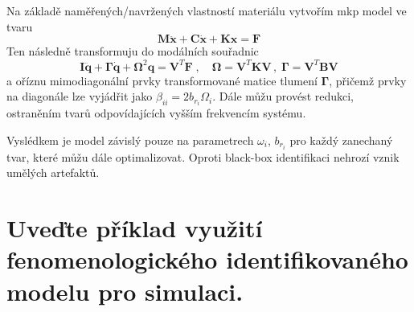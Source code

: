 \documentclass{article}
\begin{document}
	Na základě naměřených/navržených vlastností materiálu vytvořím mkp model ve tvaru
	\begin{equation*}
		\bm{M}\bm{\ddot{x}} + \bm{C}\bm{\dot{x}} + \bm{K}\bm{x} = \bm{F}
	\end{equation*}
	Ten následně transformuju do modálních souřadnic
	\begin{equation*}
		\bm{I}\bm{\ddot{q}} + \bm{\Gamma}\bm{\dot{q}} + \bm{\Omega}^2 \bm{q} = \bm{V}^T \bm{F}
		\;,\quad 
		\bm{\Omega} = \bm{V}^T\bm{K}\bm{V}
		\,,\;
		\bm{\Gamma} = \bm{V}^T\bm{B}\bm{V}
	\end{equation*}
	a oříznu mimodiagonální prvky transformované matice tlumení $\bm{\Gamma}$, přičemž prvky na diagonále lze vyjádřit jako $\beta_{ii} = 2 b_{r_i} \Omega_i$. Dále můžu provést redukci, ostraněním tvarů odpovídajících vyšším frekvencím systému.

	Vyslédkem je model závislý pouze na parametrech $\omega_i$, $b_{r_i}$ 	pro každý zanechaný tvar, které můžu dále optimalizovat. Oproti black-box identifikaci nehrozí vznik umělých artefaktů.

	\section{Uveďte příklad využití fenomenologického identifikovaného modelu pro simulaci. }
	
\end{document}
